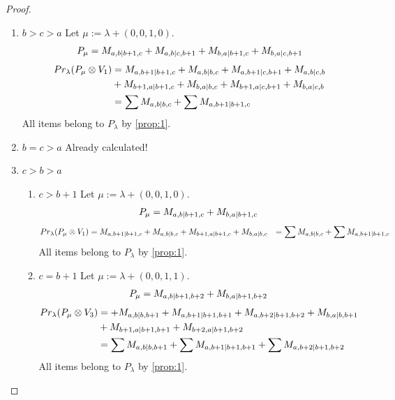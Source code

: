 \begin{proof}
\begin{enumerate}
\item $b>c>a$
        Let $\mu:=\lambda + (0,0,1,0) $. 
\begin{equation}\notag
  \begin{aligned}
      P_{\mu} =
M_{a,b|b+1,c}
+M_{a,b|c,b+1}
+M_{b,a|b+1,c}
+M_{b,a|c,b+1}
  \end{aligned}
\end{equation}
\begin{equation}\notag
  \begin{aligned}
  Pr_{\lambda}(P_\mu \otimes V_1) &=
M_{a,b+1|b+1,c}
+M_{a,b|b,c}
+M_{a,b+1|c,b+1}
+M_{a,b|c,b} \\
                                  &+
M_{b+1,a|b+1,c}
+M_{b,a|b,c}
+M_{b+1,a|c,b+1}
+M_{b,a|c,b} \\
                                  &=
\sum M_{a,b|b,c}
+\sum M_{a,b+1|b+1,c}
  \end{aligned}
\end{equation}
All items belong to $P_\lambda$ by \cref{prop:1}.
  
\item $b=c>a$ Already calculated!

\item $c>b>a$
  \begin{enumerate}
    \item $c>b+1$
        Let $\mu:=\lambda + (0,0,1,0) $. 
\begin{equation}\notag
  \begin{aligned}
      P_{\mu} =
M_{a,b|b+1,c}
+M_{b,a|b+1,c}
  \end{aligned}
\end{equation}
\begin{equation}\notag
  \begin{aligned}
  Pr_{\lambda}(P_\mu \otimes V_1) &=
M_{a,b+1|b+1,c}
+M_{a,b|b,c}
+M_{b+1,a|b+1,c}
+M_{b,a|b,c}
                                  &=
\sum M_{a,b|b,c}
+\sum M_{a,b+1|b+1,c}
  \end{aligned}
\end{equation}
All items belong to $P_\lambda$ by \cref{prop:1}.

    \item $c=b+1$
        Let $\mu:=\lambda + (0,0,1,1) $. 
\begin{equation}\notag
  \begin{aligned}
      P_{\mu} =
M_{a,b|b+1,b+2}
+M_{b,a|b+1,b+2}
  \end{aligned}
\end{equation}
\begin{equation}\notag
  \begin{aligned}
  Pr_{\lambda}(P_\mu \otimes V_3) &=
+M_{a,b|b,b+1}
+M_{a,b+1|b+1,b+1}
+M_{a,b+2|b+1,b+2}
+M_{b,a|b,b+1} \\
                                  &+
M_{b+1,a|b+1,b+1}
+M_{b+2,a|b+1,b+2} \\
                                  &=
\sum M_{a,b|b,b+1}
+\sum M_{a,b+1|b+1,b+1}
+\sum M_{a,b+2|b+1,b+2}
  \end{aligned}
\end{equation}
All items belong to $P_\lambda$ by \cref{prop:1}.
  \end{enumerate}


\end{enumerate}
\end{proof}
